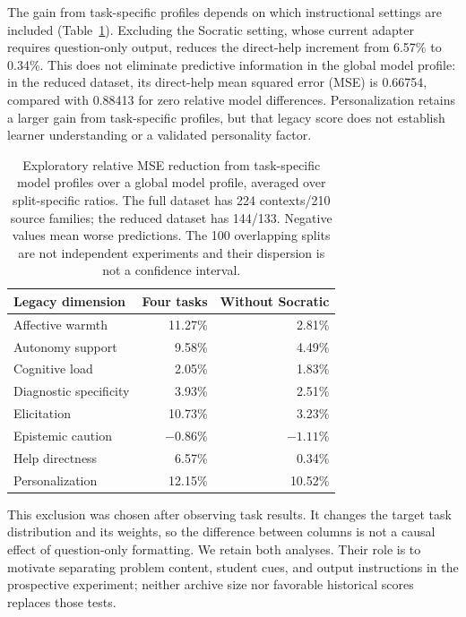 The gain from task-specific profiles depends on which instructional settings are
included (Table~\ref{tab:archive-profile-sensitivity}). Excluding the Socratic
setting, whose current adapter requires question-only output, reduces the
direct-help increment from 6.57\% to 0.34\%. This does not eliminate predictive
information in the global model profile: in the reduced dataset, its direct-help
mean squared error (MSE) is 0.66754, compared with 0.88413 for zero relative model differences.
Personalization retains a larger gain from task-specific profiles, but that legacy
score does not establish learner understanding or a validated personality factor.

\begin{table}[ht]
\centering\small
\begin{tabular}{lrr}
\toprule
Legacy dimension & Four tasks & Without Socratic\\
\midrule
Affective warmth & 11.27\% & 2.81\%\\
Autonomy support & 9.58\% & 4.49\%\\
Cognitive load & 2.05\% & 1.83\%\\
Diagnostic specificity & 3.93\% & 2.51\%\\
Elicitation & 10.73\% & 3.23\%\\
Epistemic caution & $-0.86$\% & $-1.11$\%\\
Help directness & 6.57\% & 0.34\%\\
Personalization & 12.15\% & 10.52\%\\
\bottomrule
\end{tabular}
\caption{Exploratory relative MSE reduction from task-specific model profiles
over a global model profile, averaged over split-specific ratios. The full
dataset has 224 contexts/210 source families; the reduced dataset has 144/133.
Negative values mean worse predictions. The 100 overlapping splits are not
independent experiments and their dispersion is not a confidence interval.}
\label{tab:archive-profile-sensitivity}
\end{table}

This exclusion was chosen after observing task results. It changes the target
task distribution and its weights, so the difference between columns is not a
causal effect of question-only formatting. We retain both analyses. Their role
is to motivate separating problem content, student cues, and output instructions
in the prospective experiment; neither archive size nor favorable historical scores replaces those tests.

